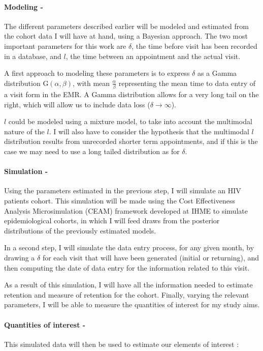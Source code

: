 \paragraph{Modeling -} The different parameters described earlier will be modeled and estimated  from the cohort data I will have at hand, using a Bayesian approach. The two most important parameters for this work are $\delta$, the time before visit has been recorded in a database, and $l$, the time between an appointment and the actual visit.

A first approach to modeling these parameters is to express $\delta$ as a Gamma distribution $\mathrm{G}(\alpha , \beta)$, with mean $\frac{\alpha}{\beta}$ representing the mean time to data entry of a visit form in the EMR. A Gamma distribution allows for a very long tail on the right, which will allow us to include data loss ($\delta  \rightarrow  \infty$).

$l$ could be modeled using a mixture model, to take into account the multimodal nature of the $l$. I will also have to consider the hypothesis that the multimodal $l$ distribution results from unrecorded shorter term appointments, and if this is the case we may need to use a long tailed distribution as for $\delta$.

\paragraph{Simulation - } Using the parameters estimated in the previous step, I will simulate an HIV patients cohort. This simulation will be made using the Cost Effectiveness Analysis Microsimulation (CEAM) framework developed at IHME to simulate epidemiological cohorts, in which I will feed draws from the posterior distributions of the previously estimated models.

In a second step, I will simulate the data entry process, for any given month, by drawing a $\delta$ for each visit that will have been generated (initial or returning), and then computing the date of data entry for the information related to this visit.

As a result of this simulation, I will have all the information needed to estimate retention and measure of retention for the cohort. Finally, varying the relevant parameters, I will be able to measure the quantities of interest for my study aims.

\paragraph{Quantities of interest -} This simulated data will then be used to estimate our elements of interest :

